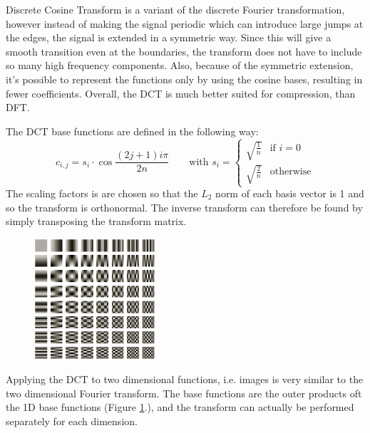       Discrete Cosine Transform is a variant of the discrete Fourier transformation, however instead of making the signal periodic which can introduce large jumps at the edges, the signal is extended in a symmetric way. Since this will give a smooth transition even at the boundaries, the transform does not have to include so many high frequency components. Also, because of the symmetric extension, it's possible to represent the functions only by using the cosine bases, resulting in fewer coefficients. Overall, the DCT is much better suited for compression, than DFT.

      The DCT base functions are defined in the following way:
      \begin{equation}
      c_{i,j} = s_i \cdot \cos \frac{(2j+1)i\pi}{2n} \qquad \text{with } s_i = 
          \begin{cases}
            \sqrt{\frac{1}{n}} & \text{if } i=0 \\
            \sqrt{\frac{2}{n}} & \text{otherwise}
          \end{cases}
      \end{equation}
      The scaling factors is are chosen so that the $L_2$ norm of each basis vector is 1 and
      so the transform is orthonormal. The inverse transform can therefore be found by
      simply transposing the transform matrix.

      \begin{figure}
        \centering
        \includegraphics[width=0.4\textwidth]{DCT_bases}
        \label{fig:DCT_bases}
      \end{figure}

      Applying the DCT to two dimensional functions, i.e. images is very similar to the two dimensional Fourier transform. The base functions are the outer products oft the 1D base functions (Figure \ref{fig:DCT_bases}.), and the transform can actually be performed separately for each dimension.

